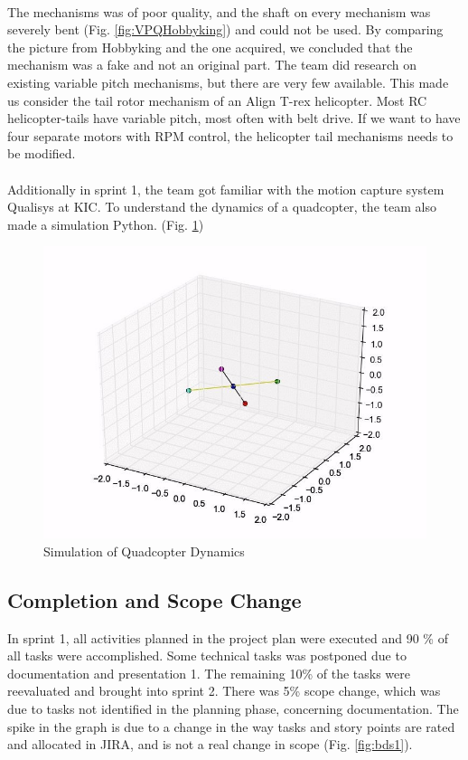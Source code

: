 \\
The mechanisms was of poor quality, and the shaft on every mechanism was severely bent (Fig. \ref{fig:VPQHobbyking}) and could not be used. By comparing the picture from Hobbyking and the one acquired, we concluded that the mechanism was a fake and not an original part. The team did research on existing variable pitch mechanisms, but there are very few available. This made us consider the tail rotor mechanism of an Align T-rex helicopter. Most RC helicopter-tails have variable pitch, most often with belt drive. If we want to have four separate motors with RPM control, the helicopter tail mechanisms needs to be modified.
\\\\
Additionally in sprint 1, the team got familiar with the motion capture system Qualisys at KIC. To understand the dynamics of a quadcopter, the team also made a simulation Python. (Fig. \ref{fig:simulation}) 

\begin{figure}[h]
        \centering
        \includegraphics[scale = 0.6]{VAPIQ-PICTURES/simulation}
        \caption{Simulation of Quadcopter Dynamics}
        \label{fig:simulation}
\end{figure}  
\clearpage

\subsection{Completion and Scope Change}

In sprint 1, all activities planned in the project plan were executed and 90 \% of all tasks were accomplished. Some technical tasks was postponed due to documentation and presentation 1. The remaining 10\% of the tasks were reevaluated and brought into sprint 2. There was 5\% scope change, which was due to tasks not identified in the planning phase, concerning documentation. The spike in the graph is due to a change in the way tasks and story points are rated and allocated in JIRA, and is not a real change in scope (Fig. \ref{fig:bds1}). 
\\

